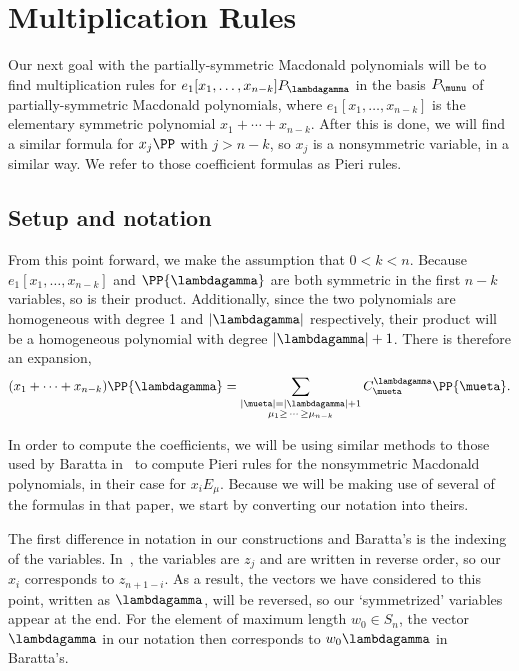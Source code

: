 \section{Multiplication Rules}\label{ElementaryMultiplication}

Our next goal with the partially-symmetric Macdonald polynomials will be to find multiplication rules for $e_1[x_1,\dotsc, x_{n-k}] P_{\lambdagamma}$ in the basis $P_{\munu}$ of partially-symmetric Macdonald polynomials, where $e_1[x_1,\dotsc, x_{n-k}]$ is the elementary symmetric polynomial $x_1+ \dotsm + x_{n-k}$. After this is done, we will find a similar formula for $x_j \PP$ with $j>n-k$, so $x_j$ is a nonsymmetric variable, in a similar way. We refer to those coefficient formulas as Pieri rules.


	\subsection{Setup and notation}
From this point forward, we make the assumption that $0<k<n$. Because $e_1[x_1, \dotsc, x_{n-k}]$ and $\PP{\lambdagamma}$ are both symmetric in the first $n-k$ variables, so is their product. Additionally, since the two polynomials are homogeneous with degree 1 and $|\lambdagamma|$ respectively, their product will be a homogeneous polynomial with degree $|\lambdagamma|+1$. There is therefore an expansion,
\begin{equation}\label{finalexpansion} (x_{1} + \dots + x_{n-k}) \PP{\lambdagamma} =  \sum_{\substack{|\mueta| = |\lambdagamma| + 1 \\ \mu_1 \geq \, \dotsm \, \geq \mu_{n-k}}}  C^{\lambdagamma}_{\mueta} \PP{\mueta}.  \end{equation}

In order to compute the coefficients, we will be using similar methods to those used by Baratta in~\cite{MR2525842} to compute Pieri rules for the nonsymmetric Macdonald polynomials, in their case for $x_i E_\mu$. Because we will be making use of several of the formulas in that paper, we start by converting our notation into theirs.

The first difference in notation in our constructions and Baratta's is the indexing of the variables. In~\cite{MR2525842}, the variables are $z_j$ and are written in reverse order, so our $x_i$ corresponds to $z_{n+1-i}$. As a result, the vectors we have considered to this point, written as $\lambdagamma$, will be reversed, so our `symmetrized' variables appear at the end. For the element of maximum length $w_0 \in S_n$, the vector $\lambdagamma$ in our notation then corresponds to $w_0\lambdagamma$ in Baratta's.

